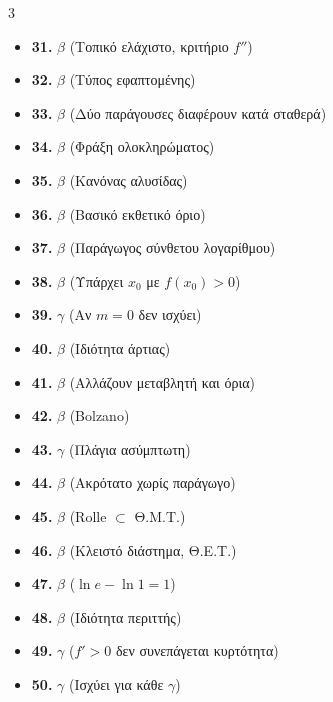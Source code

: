 \documentclass[11pt,a4paper]{article}
\begin{document}
\begin{tcolorbox}[colback=black!5!white, colframe=black, title=\textbf{Σωστά Γράμματα (Κλειδί)}]
\begin{multicols}{3}
\begin{itemize}[label=$-$]
    \item \textbf{31.} $\beta$ (Τοπικό ελάχιστο, κριτήριο $f''$)
    \item \textbf{32.} $\beta$ (Τύπος εφαπτομένης)
    \item \textbf{33.} $\beta$ (Δύο παράγουσες διαφέρουν κατά σταθερά)
    \item \textbf{34.} $\beta$ (Φράξη ολοκληρώματος)
    \item \textbf{35.} $\beta$ (Κανόνας αλυσίδας)
    \item \textbf{36.} $\beta$ (Βασικό εκθετικό όριο)
    \item \textbf{37.} $\beta$ (Παράγωγος σύνθετου λογαρίθμου)
    \item \textbf{38.} $\beta$ (Υπάρχει $x_0$ με $f(x_0)>0$)
    \item \textbf{39.} $\gamma$ (Αν $m=0$ δεν ισχύει)
    \item \textbf{40.} $\beta$ (Ιδιότητα άρτιας)
    \item \textbf{41.} $\beta$ (Αλλάζουν μεταβλητή και όρια)
    \item \textbf{42.} $\beta$ (Bolzano)
    \item \textbf{43.} $\gamma$ (Πλάγια ασύμπτωτη)
    \item \textbf{44.} $\beta$ (Ακρότατο χωρίς παράγωγο)
    \item \textbf{45.} $\beta$ (Rolle $\subset$ Θ.Μ.Τ.)
    \item \textbf{46.} $\beta$ (Κλειστό διάστημα, Θ.Ε.Τ.)
    \item \textbf{47.} $\beta$ ($\ln e - \ln 1 = 1$)
    \item \textbf{48.} $\beta$ (Ιδιότητα περιττής)
    \item \textbf{49.} $\gamma$ ($f'>0$ δεν συνεπάγεται κυρτότητα)
    \item \textbf{50.} $\gamma$ (Ισχύει για κάθε $\gamma$)
\end{itemize}
\end{multicols}
\end{tcolorbox}
\end{document}
